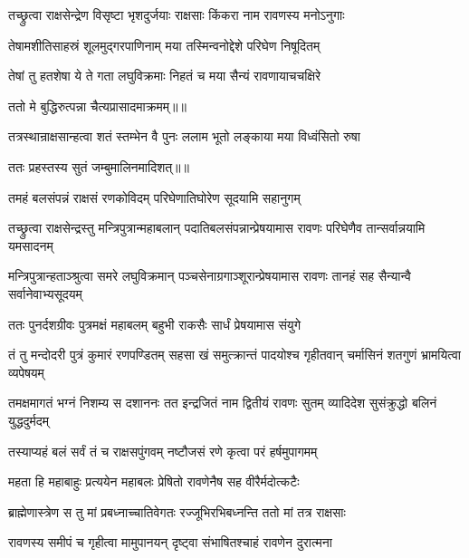\twolineshloka
{तच्छ्रुत्वा राक्षसेन्द्रेण विसृष्टा भृशदुर्जयाः}
{राक्षसाः किंकरा नाम रावणस्य मनोऽनुगाः} %

\twolineshloka
{तेषामशीतिसाहस्रं शूलमुद्गरपाणिनाम्}
{मया तस्मिन्वनोद्देशे परिघेण निषूदितम्} %

\twolineshloka
{तेषां तु हतशेषा ये ते गता लघुविक्रमाः}
{निहतं च मया सैन्यं रावणायाचचक्षिरे} %

{ततो मे बुद्धिरुत्पन्ना चैत्यप्रासादमाक्रमम्॥॥} %

\addtocounter{shlokacount}{1}

\twolineshloka
{तत्रस्थान्राक्षसान्हत्वा शतं स्तम्भेन वै पुनः}
{ललाम भूतो लङ्काया मया विध्वंसितो रुषा} %

{ततः प्रहस्तस्य सुतं जम्बुमालिनमादिशत्॥॥} %

\addtocounter{shlokacount}{1}

\twolineshloka
{तमहं बलसंपन्नं राक्षसं रणकोविदम्}
{परिघेणातिघोरेण सूदयामि सहानुगम्} %

\threelineshloka
{तच्छ्रुत्वा राक्षसेन्द्रस्तु मन्त्रिपुत्रान्महाबलान्}
{पदातिबलसंपन्नान्प्रेषयामास रावणः}
{परिघेणैव तान्सर्वान्नयामि यमसादनम्} %

\threelineshloka
{मन्त्रिपुत्रान्हताञ्श्रुत्वा समरे लघुविक्रमान्}
{पञ्चसेनाग्रगाञ्शूरान्प्रेषयामास रावणः}
{तानहं सह सैन्यान्वै सर्वानेवाभ्यसूदयम्} %

\twolineshloka
{ततः पुनर्दशग्रीवः पुत्रमक्षं महाबलम्}
{बहुभी राकसैः सार्धं प्रेषयामास संयुगे} %

\threelineshloka
{तं तु मन्दोदरी पुत्रं कुमारं रणपण्डितम्}
{सहसा खं समुत्क्रान्तं पादयोश्च गृहीतवान्}
{चर्मासिनं शतगुणं भ्रामयित्वा व्यपेषयम्} %

\threelineshloka
{तमक्षमागतं भग्नं निशम्य स दशाननः}
{तत इन्द्रजितं नाम द्वितीयं रावणः सुतम्}
{व्यादिदेश सुसंक्रुद्धो बलिनं युद्धदुर्मदम्} %

\twolineshloka
{तस्याप्यहं बलं सर्वं तं च राक्षसपुंगवम्}
{नष्टौजसं रणे कृत्वा परं हर्षमुपागमम्} %

\twolineshloka
{महता हि महाबाहुः प्रत्ययेन महाबलः}
{प्रेषितो रावणेनैष सह वीरैर्मदोत्कटैः} %

\twolineshloka
{ब्राह्मेणास्त्रेण स तु मां प्रबध्नाच्चातिवेगतः}
{रज्जूभिरभिबध्नन्ति ततो मां तत्र राक्षसाः} %

\twolineshloka
{रावणस्य समीपं च गृहीत्वा मामुपानयन्}
{दृष्ट्वा संभाषितश्चाहं रावणेन दुरात्मना} %

